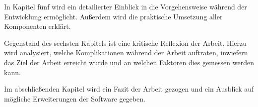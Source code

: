 In Kapitel fünf wird ein detailierter Einblick in die Vorgehensweise während der Entwicklung ermöglicht. Außerdem wird die praktische Umsetzung aller Komponenten erklärt.

\vspace{6mm}

\vspace{-2mm}

Gegenstand des sechsten Kapitels ist eine kritische Reflexion der Arbeit. Hierzu wird analysiert, welche Komplikationen während der Arbeit auftraten,
inwiefern das Ziel der Arbeit erreicht wurde und an welchen Faktoren dies gemessen werden kann.

\vspace{6mm}

\vspace{-2mm}

Im abschließenden Kapitel wird ein Fazit der Arbeit gezogen und ein Ausblick auf mögliche Erweiterungen der Software gegeben.
